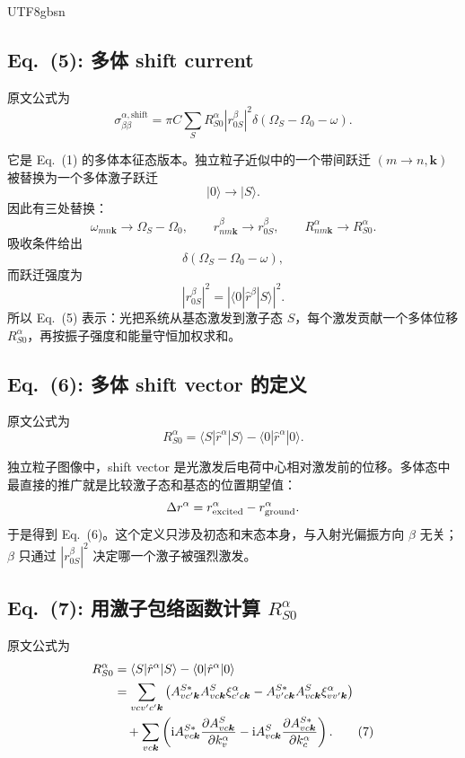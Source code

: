 \documentclass[11pt,a4paper]{article}
\newcommand{\ii}{\mathrm{i}}
\begin{document}
\begin{CJK}{UTF8}{gbsn}
\subsection*{Eq.~(5): 多体 shift current}

原文公式为
\begin{equation}
\sigma^{\alpha,\mathrm{shift}}_{\beta\beta}
=\pi C\sum_S
R^\alpha_{S0}\left|r^\beta_{0S}\right|^2
\delta(\Omega_S-\Omega_0-\omega).
\tag{5}
\end{equation}

它是 Eq.~(1) 的多体本征态版本。独立粒子近似中的一个带间跃迁
$(m\to n,\bm k)$ 被替换为一个多体激子跃迁
\[
|0\rangle\rightarrow |S\rangle.
\]
因此有三处替换：
\[
\omega_{mn\bm k}\rightarrow \Omega_S-\Omega_0,\qquad
r^\beta_{nm\bm k}\rightarrow r^\beta_{0S},\qquad
R^\alpha_{nm\bm k}\rightarrow R^\alpha_{S0}.
\]
吸收条件给出
\[
\delta(\Omega_S-\Omega_0-\omega),
\]
而跃迁强度为
\[
|r^\beta_{0S}|^2
=\left|\langle 0|\hat r^\beta|S\rangle\right|^2.
\]
所以 Eq.~(5) 表示：光把系统从基态激发到激子态 $S$，每个激发贡献一个多体位移
$R^\alpha_{S0}$，再按振子强度和能量守恒加权求和。

\subsection*{Eq.~(6): 多体 shift vector 的定义}

原文公式为
\begin{equation}
R^\alpha_{S0}
=\langle S|\hat r^\alpha|S\rangle
-\langle 0|\hat r^\alpha|0\rangle.
\tag{6}
\end{equation}

独立粒子图像中，shift vector 是光激发后电荷中心相对激发前的位移。多体态中最直接的推广就是比较激子态和基态的位置期望值：
\[
\Delta r^\alpha
=r^\alpha_{\rm excited}-r^\alpha_{\rm ground}.
\]
于是得到 Eq.~(6)。这个定义只涉及初态和末态本身，与入射光偏振方向 $\beta$ 无关；$\beta$ 只通过 $|r^\beta_{0S}|^2$ 决定哪一个激子被强烈激发。

\subsection*{Eq.~(7): 用激子包络函数计算 $R^\alpha_{S0}$}

原文公式为
\begin{align}
R^\alpha_{S0}
&=\langle S|\hat r^\alpha|S\rangle
-\langle 0|\hat r^\alpha|0\rangle
\notag\\
&=
\sum_{vcv'c'\bm k}
\left(
A^{S*}_{vc'\bm k}A^S_{vc\bm k}\xi^\alpha_{c'c\bm k}
-A^{S*}_{v'c\bm k}A^S_{vc\bm k}\xi^\alpha_{vv'\bm k}
\right)
\notag\\
&\quad
+\sum_{vc\bm k}
\left(
\ii A^{S*}_{vc\bm k}
\frac{\partial A^S_{vc\bm k}}{\partial k^\alpha_v}
-\ii A^S_{vc\bm k}
\frac{\partial A^{S*}_{vc\bm k}}{\partial k^\alpha_c}
\right).
\tag{7}
\end{align}


\end{CJK}
\end{document}
